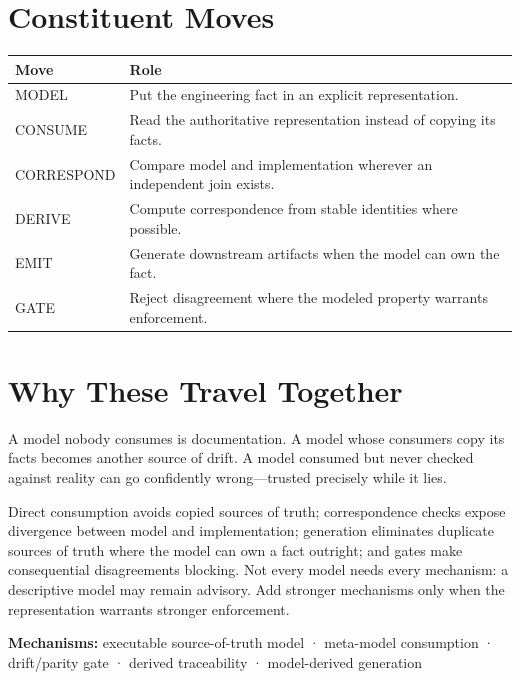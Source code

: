\section{Constituent Moves}\label{heading:constituent-moves}

{\footnotesize
{\def\LTcaptype{none} %
\begin{longtable}[]{@{}
  >{\raggedright\arraybackslash}p{}
  >{\raggedright\arraybackslash}p{}@{}}
\toprule\noalign{}
\begin{minipage}[b]{\linewidth}\raggedright
Move
\end{minipage} & \begin{minipage}[b]{\linewidth}\raggedright
Role
\end{minipage} \\
\midrule\noalign{}
\endhead
\bottomrule\noalign{}
\endlastfoot
MODEL & Put the engineering fact in an explicit representation. \\
CONSUME & Read the authoritative representation instead of copying its facts. \\
CORRESPOND & Compare model and implementation wherever an independent join exists. \\
DERIVE & Compute correspondence from stable identities where possible. \\
EMIT & Generate downstream artifacts when the model can own the fact. \\
GATE & Reject disagreement where the modeled property warrants enforcement. \\
\end{longtable}
}
}

\section{Why These Travel Together}\label{heading:why-these-travel-together}

A model nobody consumes is documentation. A model whose consumers copy its facts becomes another source of drift. A model consumed but never checked against reality can go confidently wrong---trusted precisely while it lies.

Direct consumption avoids copied sources of truth; correspondence checks expose divergence between model and implementation; generation eliminates duplicate sources of truth where the model can own a fact outright; and gates make consequential disagreements blocking. Not every model needs every mechanism: a descriptive model may remain advisory. Add stronger mechanisms only when the representation warrants stronger enforcement.

\textbf{Mechanisms:} executable source-of-truth model · meta-model consumption · drift/parity gate · derived traceability · model-derived generation
